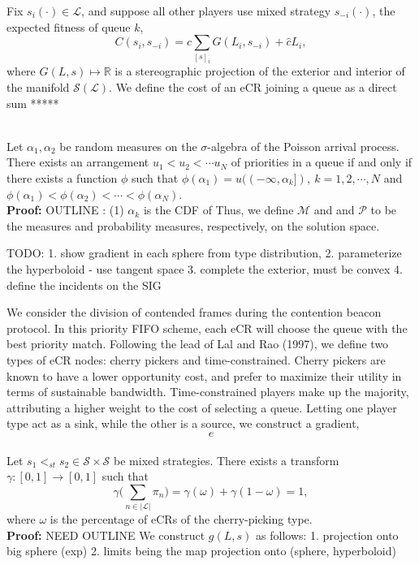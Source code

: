 \documentclass[10pt]{article}
\newcommand{\mcL}{\mathcal{L}}
\newcommand{\mcM}{\mathcal{M}}
\newcommand{\mcP}{\mathcal{P}}
\newcommand{\mcS}{\mathcal{S}}
\theoremstyle{definition}
\begin{document}
Fix $s_i(\cdot) \in \mcL$, and suppose all other players use mixed strategy
$s_{-i}(\cdot)$, the expected fitness of queue $k$, 
$$
   C(s_i, s_{-i}) = c\displaystyle\sum_{[s]_i} G(L_i, s_{-i}) + \hat c L_i,
$$
where $G(L,s)\mapsto \mathbb{R}$ is a stereographic projection of the
exterior and interior of the manifold $\mcS(\mcL)$. We define the cost of an eCR
joining a queue as a direct sum *****

{\\
Let $\alpha_1, \alpha_2$ be random measures on the $\sigma$-algebra of the
Poisson arrival process.
There exists an arrangement $u_1<u_2<\cdots u_N$ of priorities in a queue if
and only if there exists a function $\phi$ such that $\phi(\alpha_1) =
u((-\infty,\alpha_k]), \ k = 1,2,\cdots, N$ and $\phi(\alpha_1) <
\phi(\alpha_2) < \cdots < \phi(\alpha_N)$.
}\\
\textbf{Proof:} OUTLINE : (1) $\alpha_k$ is the CDF of 
Thus, we define $\mcM$ and and $\mcP$ to be the measures and probability measures,
respectively, on the solution space.


TODO: 
1. show gradient in each sphere from type distribution,
2. parameterize the hyperboloid
- use tangent space
3. complete the exterior, must be convex
4. define the incidents on the SIG

We consider the division of contended frames during the contention beacon
protocol. In this priority FIFO scheme, each eCR will
choose the queue with the best priority match. Following the lead of Lal
and Rao (1997), we define two types of eCR nodes: cherry pickers and
time-constrained. Cherry pickers are known to have a lower opportunity cost, and
prefer to maximize their utility in terms of sustainable bandwidth. 
Time-constrained players make up the majority, attributing a higher weight to
the cost of selecting a queue. Letting one player type act as a sink, while the other
is a source, we construct a gradient,
$$
    e
$$
{\\ 
Let $s_1 <_{st} s_2 \in \mcS\times \mcS$ be mixed strategies.
There exists a transform $\gamma: [0,1] \rightarrow [0,1]$ such that 
$$
\gamma\bigg( \displaystyle\sum_{n \in \vert \mcL\vert} \pi_n\bigg ) =
\gamma(\omega) + \gamma(1-\omega) = 1,
$$
where $\omega$ is the percentage of eCRs of the cherry-picking type.
}\\
\textbf{Proof:} NEED OUTLINE
We construct $g(L,s)$ as follows: 
1. projection onto big sphere (exp)
2. limits being the map projection onto (sphere, hyperboloid)
\end{document}
